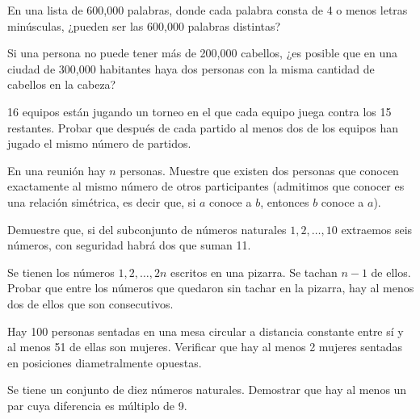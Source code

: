 \documentclass[12pt]{article}
\begin{document}
\begin{problema}
    En una lista de 600,000 palabras, donde cada palabra consta de 4 o menos letras minúsculas, ¿pueden ser las 600,000 palabras distintas?
\end{problema}

\begin{problema}
    Si una persona no puede tener más de 200,000 cabellos, ¿es posible que en una ciudad de 300,000 habitantes haya dos personas con la misma cantidad de cabellos en la cabeza?
\end{problema}

\begin{problema}
    16 equipos están jugando un torneo en el que cada equipo juega contra los 15 restantes. Probar que después de cada partido al menos dos de los equipos han jugado el mismo número de partidos.
\end{problema}

\begin{problema}
    En una reunión hay $n$ personas. Muestre que existen dos personas que conocen exactamente al mismo número de otros participantes (admitimos que conocer es una relación simétrica, es decir que, si $a$ conoce a $b$, entonces $b$ conoce a $a$).
\end{problema}

\begin{problema}
    Demuestre que, si del subconjunto de números naturales $1,2, \dots ,10$ extraemos seis números, con seguridad habrá dos que suman 11.
\end{problema}

\begin{problema}
    Se tienen los números $1, 2, \dots, 2n$ escritos en una pizarra. Se tachan $n-1$ de ellos. Probar que entre los números que quedaron sin tachar en la pizarra, hay al menos dos de ellos que son consecutivos.
\end{problema}

\begin{problema}
    Hay 100 personas sentadas en una mesa circular a distancia constante entre sí y al menos 51 de ellas son mujeres. Verificar que hay al menos 2 mujeres sentadas en posiciones diametralmente opuestas.
\end{problema}

\begin{problema}
    Se tiene un conjunto de diez números naturales. Demostrar que hay al menos un par cuya diferencia es múltiplo de 9.
\end{problema}
\end{document}
